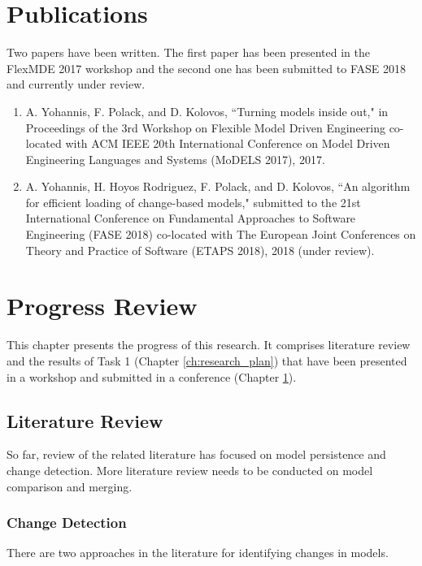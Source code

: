 \documentclass[12pt, a4paper]{report} \usepackage[titletoc]{appendix}
\begin{document}
\chapter{Publications}
\label{ch:publications}
Two papers have been written. The first paper \cite{yohannis2017turning} has been presented in the FlexMDE 2017 workshop and the second one \cite{yohannis2018algorithm} has been submitted to FASE 2018 and currently under review.
\begin{enumerate}
	\item A. Yohannis, F. Polack, and D. Kolovos, ``Turning models inside out," in Proceedings of the 3rd Workshop on Flexible Model Driven Engineering co-located with ACM IEEE 20th International Conference on Model Driven Engineering Languages and Systems (MoDELS 2017), 2017.
	\item  A. Yohannis, H. Hoyos Rodriguez, F. Polack, and D. Kolovos, ``An algorithm for efficient loading of change-based models," submitted to the 21st International Conference on Fundamental Approaches to Software Engineering (FASE 2018) co-located with The European Joint Conferences on Theory and Practice of Software (ETAPS 2018), 2018 (under review).
\end{enumerate}

\chapter{Progress Review}
\label{ch:progress_review}
This chapter presents the progress of this research. It comprises literature review and the results of Task 1 (Chapter \ref{ch:research_plan}) that have been presented in a workshop and submitted in a conference (Chapter \ref{ch:publications}). 

\section{Literature Review}
\label{sec:literature_review}
So far, review of the related literature has focused on model persistence and change detection. More literature review needs to be conducted on model comparison and merging.  

\subsection{Change Detection}
\label{subsec:change_detection}
There are two approaches in the literature for identifying changes in models.
\end{document}
